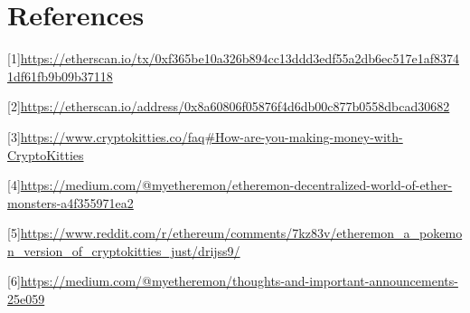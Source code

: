 \documentclass{article}
\begin{document}
\section{References}

[1]\url{https://etherscan.io/tx/0xf365be10a326b894cc13ddd3edf55a2db6ec517e1af83741df61fb9b09b37118}

[2]\url{https://etherscan.io/address/0x8a60806f05876f4d6db00c877b0558dbcad30682}

[3]\url{https://www.cryptokitties.co/faq#How-are-you-making-money-with-CryptoKitties}

[4]\url{https://medium.com/@myetheremon/etheremon-decentralized-world-of-ether-monsters-a4f355971ea2}

[5]\url{https://www.reddit.com/r/ethereum/comments/7kz83v/etheremon_a_pokemon_version_of_cryptokitties_just/drijss9/}

[6]\url{https://medium.com/@myetheremon/thoughts-and-important-announcements-25e059


}
\end{document}
